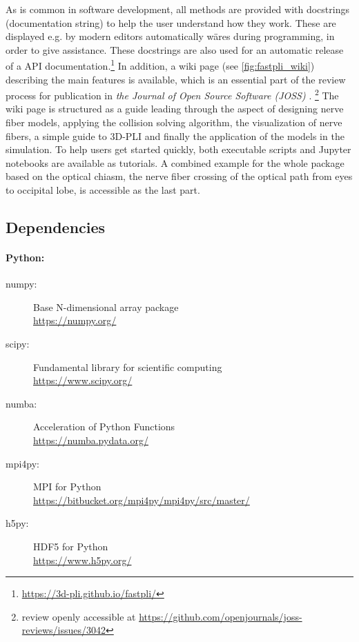 %
As is common in software development, all methods are provided with docstrings (documentation string) to help the user understand how they work.
These are displayed e.g. by modern editors automatically wäres during programming, in order to give assistance.
These docstrings are also used for an automatic release of a \ac{API} documentation.\footnote{\url{https://3d-pli.github.io/fastpli/}}
In addition, a wiki page (see \cref{fig:fastpli_wiki}) describing the main features is available, which is an essential part of the review process for publication in \textit{the Journal of Open Source Software (JOSS)} \cite{Matuschke2021}. \footnote{review openly accessible at \url{https://github.com/openjournals/joss-reviews/issues/3042}}
The wiki page is structured as a guide leading through the aspect of designing nerve fiber models, applying the collision solving algorithm, the visualization of nerve fibers, a simple guide to \ac{3D-PLI} and finally the application of the models in the simulation.
To help users get started quickly, both executable \python{} scripts and Jupyter notebooks are available as tutorials.
A combined example for the whole package based on the optical chiasm, the nerve fiber crossing of the optical path from eyes to occipital lobe, is accessible as the last part.
%
%
%
\subsection{Dependencies}
%
\paragraph{Python:}
\begin{description}
\item[numpy:] Base N-dimensional array package \cite{2019arXiv190710121V}\\
\url{https://numpy.org/}
\item[scipy:] Fundamental library for scientific computing \cite{2019arXiv190710121V}\\
\url{https://www.scipy.org/}
\item[numba:] Acceleration of Python Functions \cite{Lam2015}\\
\url{https://numba.pydata.org/}
\item[mpi4py:] MPI for Python \cite{Dalcn2005, Dalcn2008, Dalcin2011}\\
\url{https://bitbucket.org/mpi4py/mpi4py/src/master/}
\item[h5py:] HDF5 for Python \cite{collette_python_hdf5_2014, hdf5}\\
\url{https://www.h5py.org/}
\end{description}
%
